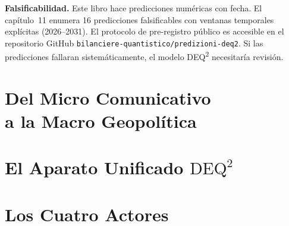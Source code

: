 \documentclass[12pt, twoside]{book}
\theoremstyle{plain}
\theoremstyle{definition}
\theoremstyle{remark}
\newcommand{\deq}{\mathrm{DEQ}^2}
\begin{document}
\textbf{Falsificabilidad.}
Este libro hace predicciones num\'{e}ricas con fecha. El cap\'{i}tulo~11 enumera 16 predicciones falsificables con ventanas temporales expl\'{i}citas (2026--2031). El protocolo de pre-registro p\'{u}blico es accesible en el repositorio GitHub \texttt{bilanciere-quantistico/predizioni-deq2}. Si las predicciones fallaran sistem\'{a}ticamente, el modelo DEQ\textsuperscript{2} necesitar\'{i}a revisi\'{o}n.

\cleardoublepage
{}

\part[Del Micro Comunicativo a la Macro Geopol\'{i}tica]{Del Micro Comunicativo\\a la Macro Geopol\'{i}tica}





\part{El Aparato Unificado \texorpdfstring{$\deq$}{DEQ²}}




\part{Los Cuatro Actores}






\end{document}
